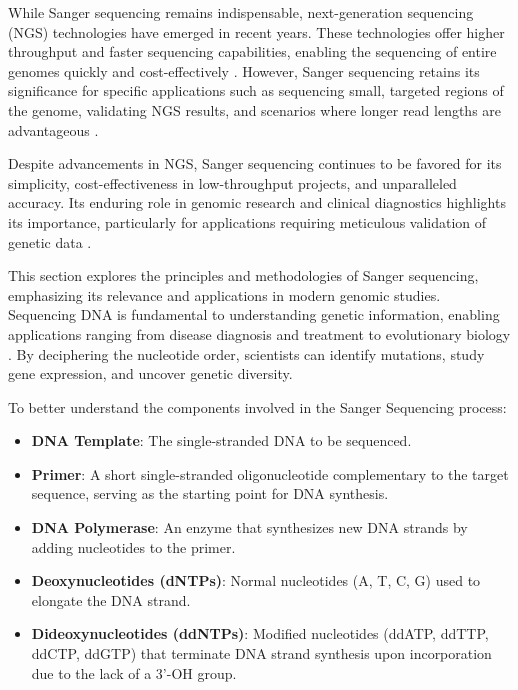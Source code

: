 While Sanger sequencing remains indispensable, next-generation sequencing (NGS) technologies have emerged in recent years. These technologies offer higher throughput and faster sequencing capabilities, enabling the sequencing of entire genomes quickly and cost-effectively \cite{metzker2010sequencing}. However, Sanger sequencing retains its significance for specific applications such as sequencing small, targeted regions of the genome, validating NGS results, and scenarios where longer read lengths are advantageous \cite{mardis2017dna}.

Despite advancements in NGS, Sanger sequencing continues to be favored for its simplicity, cost-effectiveness in low-throughput projects, and unparalleled accuracy. Its enduring role in genomic research and clinical diagnostics highlights its importance, particularly for applications requiring meticulous validation of genetic data \cite{shendure2017dna}.

This section explores the principles and methodologies of Sanger sequencing, emphasizing its relevance and applications in modern genomic studies.
Sequencing DNA is fundamental to understanding genetic information, enabling applications ranging from disease diagnosis and treatment to evolutionary biology \cite{turn0search0}. By deciphering the nucleotide order, scientists can identify mutations, study gene expression, and uncover genetic diversity.

To better understand the components involved in the Sanger Sequencing process:
\begin{itemize}
    \item \textbf{DNA Template}: The single-stranded DNA to be sequenced.
    \item \textbf{Primer}: A short single-stranded oligonucleotide complementary to the target sequence, serving as the starting point for DNA synthesis.
    \item \textbf{DNA Polymerase}: An enzyme that synthesizes new DNA strands by adding nucleotides to the primer.
    \item \textbf{Deoxynucleotides (dNTPs)}: Normal nucleotides (A, T, C, G) used to elongate the DNA strand.
    \item \textbf{Dideoxynucleotides (ddNTPs)}: Modified nucleotides (ddATP, ddTTP, ddCTP, ddGTP) that terminate DNA strand synthesis upon incorporation due to the lack of a 3'-OH group.
\end{itemize}

